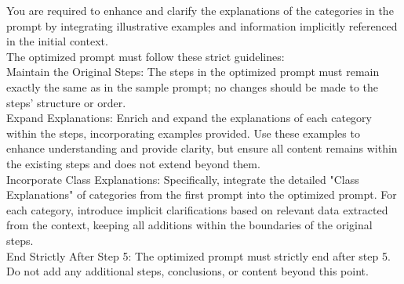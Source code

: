 You are required to enhance and clarify the explanations of the categories in the prompt by integrating illustrative examples and information implicitly referenced in the initial context. \\
 The optimized prompt must follow these strict guidelines: \\
 Maintain the Original Steps: The steps in the optimized prompt must remain exactly the same as in the sample prompt; no changes should be made to the steps’ structure or order. \\
 Expand Explanations: Enrich and expand the explanations of each category within the steps, incorporating examples provided.
 Use these examples to enhance understanding and provide clarity, but ensure all content remains within the existing steps and does not extend beyond them. \\
 Incorporate Class Explanations: Specifically, integrate the detailed "Class Explanations" of categories from the first prompt into the optimized prompt.
 For each category, introduce implicit clarifications based on relevant data extracted from the context, keeping all additions within the boundaries of the original steps. \\
 End Strictly After Step 5: The optimized prompt must strictly end after step 5.
 Do not add any additional steps, conclusions, or content beyond this point.